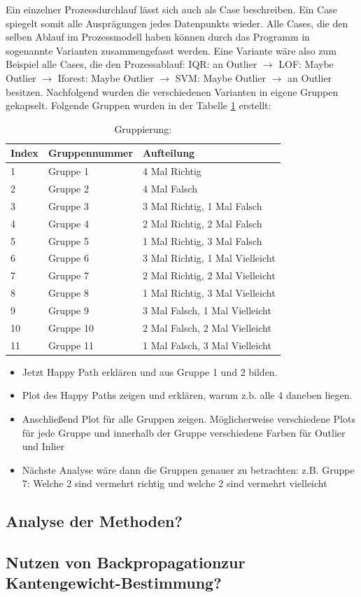 Ein einzelner Prozessdurchlauf lässt sich auch als Case beschreiben. Ein Case spiegelt somit alle Ausprägungen jedes Datenpunkts wieder. Alle Cases, die den selben Ablauf im Prozessmodell haben können durch das Programm in sogenannte Varianten zusammengefasst werden. Eine Variante wäre also zum Beispiel alle Cases, die den Prozessablauf: IQR: an Outlier $\rightarrow$ LOF: Maybe Outlier $\rightarrow$ Iforest: Maybe Outlier $\rightarrow$ SVM: Maybe Outlier $\rightarrow$ an Outlier besitzen. Nachfolgend wurden die verschiedenen Varianten in eigene Gruppen gekapselt. Folgende Gruppen wurden in der Tabelle \ref{tab:gruppierung} erstellt:
\FloatBarrier
\begin{table}[t]
	\centering
	\begin{tabular}{lll}
		\toprule
		\multicolumn{1}{l}{\textbf{Index}} & \textbf{Gruppennummer} & \textbf{Aufteilung} \\ 
		\midrule
		1 & Gruppe 1 & 4 Mal Richtig \\
		2 & Gruppe 2 & 4 Mal Falsch \\
		3 & Gruppe 3 & 3 Mal Richtig, 1 Mal Falsch \\
		4 & Gruppe 4 & 2 Mal Richtig, 2 Mal Falsch \\
		5 & Gruppe 5 & 1 Mal Richtig, 3 Mal Falsch \\
		6 & Gruppe 6 & 3 Mal Richtig, 1 Mal Vielleicht \\
		7 & Gruppe 7 & 2 Mal Richtig, 2 Mal Vielleicht \\
		8 & Gruppe 8 & 1 Mal Richtig, 3 Mal Vielleicht \\
		9 & Gruppe 9 & 3 Mal Falsch, 1 Mal Vielleicht \\
		10 & Gruppe 10 & 2 Mal Falsch, 2 Mal Vielleicht \\
		11 & Gruppe 11 & 1 Mal Falsch, 3 Mal Vielleicht \\
		\bottomrule
	\end{tabular}
	\caption{Gruppierung:}
	\label{tab:gruppierung}
\end{table}
\FloatBarrier

\begin{itemize}
	\item Jetzt Happy Path erklären und aus Gruppe 1 und 2 bilden.
	\item Plot des Happy Paths zeigen und erklären, warum z.b. alle 4 daneben liegen.
	\item Anschließend Plot für alle Gruppen zeigen. Möglicherweise verschiedene Plots für jede Gruppe und innerhalb der Gruppe verschiedene Farben für Outlier und Inlier
	\item Nächste Analyse wäre dann die Gruppen genauer zu betrachten: z.B. Gruppe 7: Welche 2 sind vermehrt richtig und welche 2 sind vermehrt vielleicht
\end{itemize}

\subsection{Analyse der Methoden?}
\subsection{Nutzen von Backpropagationzur Kantengewicht-Bestimmung?}